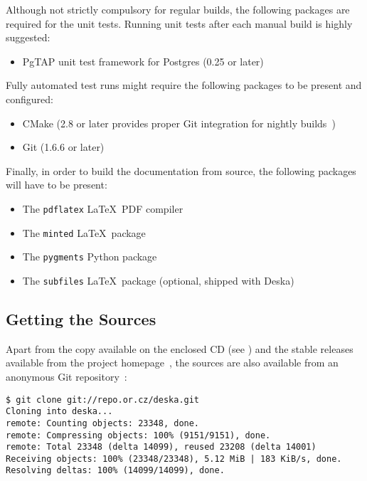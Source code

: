 \documentclass[deska]{subfiles}
\begin{document}
Although not strictly compulsory for regular builds, the following packages are required for the unit tests.  Running
unit tests after each manual build is highly suggested:

\begin{itemize}
    \item PgTAP unit test framework for Postgres (0.25 or later)~\cite{pgtap}
\end{itemize}

Fully automated test runs might require the following packages to be present and configured:

\begin{itemize}
    \item CMake (2.8 or later provides proper Git integration for nightly builds~\cite{deska-dashboard})
    \item Git (1.6.6 or later)
\end{itemize}

Finally, in order to build the documentation from source, the following packages will have to be present:

\begin{itemize}
    \item The {\tt pdflatex} \LaTeX~PDF compiler
    \item The {\tt minted} \LaTeX~package~\cite{latex-minted}
    \item The {\tt pygments} Python package~\cite{pygments}
    \item The {\tt subfiles} \LaTeX~package (optional, shipped with Deska)~\cite{latex-subfiles}
\end{itemize}

\subsection{Getting the Sources}

Apart from the copy available on the enclosed CD (see ) and the stable releases available from
the project homepage~\cite{deska-project}, the sources are also available from an anonymous Git
repository~\cite{deska-git}:

\begin{verbatim}
$ git clone git://repo.or.cz/deska.git
Cloning into deska...
remote: Counting objects: 23348, done.
remote: Compressing objects: 100% (9151/9151), done.
remote: Total 23348 (delta 14099), reused 23208 (delta 14001)
Receiving objects: 100% (23348/23348), 5.12 MiB | 183 KiB/s, done.
Resolving deltas: 100% (14099/14099), done.
\end{verbatim}
\end{document}
